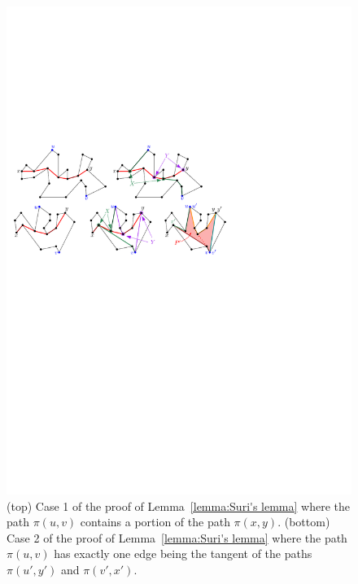 \documentclass[a4paper]{article}
\newcommand{\p}[2]{\ensuremath{\pi(#1, #2)}}
\begin{document}
\begin{figure}[tb]
\centering
\includegraphics{img/OutputSensitive.pdf}

\caption{\small (top) Case 1 of the proof of Lemma~\ref{lemma:Suri's lemma} where the path $\p{u}{v}$ contains a portion of the path $\p{x}{y}$.
(bottom) Case 2 of the proof of Lemma~\ref{lemma:Suri's lemma} where the path $\p{u}{v}$ has exactly one edge being the tangent of the paths $\p{u'}{y'}$ and $\p{v'}{x'}$.}
\label{fig:Output Sensitive Algorithm}
\end{figure}
\end{document}
